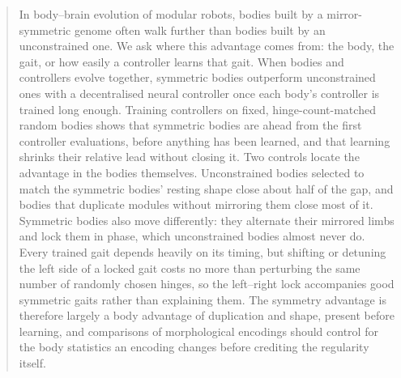 \begin{abstract}
In body--brain evolution of modular robots, bodies built by a mirror-symmetric genome often walk further than bodies built by an unconstrained one. We ask where this advantage comes from: the body, the gait, or how easily a controller learns that gait. When bodies and controllers evolve together, symmetric bodies outperform unconstrained ones with a decentralised neural controller once each body's controller is trained long enough. Training controllers on fixed, hinge-count-matched random bodies shows that symmetric bodies are ahead from the first controller evaluations, before anything has been learned, and that learning shrinks their relative lead without closing it. Two controls locate the advantage in the bodies themselves. Unconstrained bodies selected to match the symmetric bodies' resting shape close about half of the gap, and bodies that duplicate modules without mirroring them close most of it. Symmetric bodies also move differently: they alternate their mirrored limbs and lock them in phase, which unconstrained bodies almost never do. Every trained gait depends heavily on its timing, but shifting or detuning the left side of a locked gait costs no more than perturbing the same number of randomly chosen hinges, so the left--right lock accompanies good symmetric gaits rather than explaining them. The symmetry advantage is therefore largely a body advantage of duplication and shape, present before learning, and comparisons of morphological encodings should control for the body statistics an encoding changes before crediting the regularity itself.
\end{abstract}

